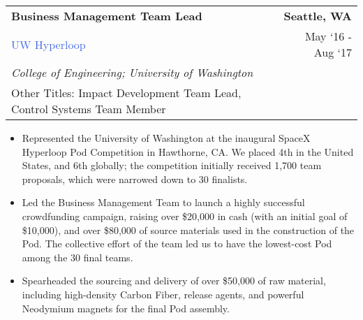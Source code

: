 \documentclass[10pt]{article}
\newcommand{\highlightcolor}{RoyalBlue}
\newcommand{\tabularxwidth}{\textwidth}
\begin{document}
    \begin{minipage}{\tabularxwidth}

        \begin{tabularx}{\tabularxwidth}{X r}
            \textbf{Business Management Team Lead} & \textbf{Seattle, 
        WA} \\
            \textcolor{\highlightcolor}{UW Hyperloop} & 
        
    May ‘16 - 
    Aug ‘17 \\
            
                
                    \textit{College of Engineering; University of Washington} & \\
                
            
            
                Other Titles: Impact Development Team Lead, Control Systems Team Member & \\
            
        \end{tabularx}

        \begin{itemize}[noitemsep, topsep=3pt, parsep=0pt, partopsep=0pt]
            
                \item 
    Represented the University of Washington at the inaugural SpaceX Hyperloop Pod Competition in Hawthorne, CA. We placed 4th in the United States, and 6th globally; the competition initially received 1,700 team proposals, which were narrowed down to 30 finalists.
            
                \item 
    Led the Business Management Team to launch a highly successful crowdfunding campaign, raising over \$20,000 in cash (with an initial goal of \$10,000), and over \$80,000 of source materials used in the construction of the Pod. The collective effort of the team led us to have the lowest-cost Pod among the 30 final teams.
            
                \item 
    Spearheaded the sourcing and delivery of over \$50,000 of raw material, including high-density Carbon Fiber, release agents, and powerful Neodymium magnets for the final Pod assembly.
            

\end{itemize}
\end{minipage}
\end{document}
